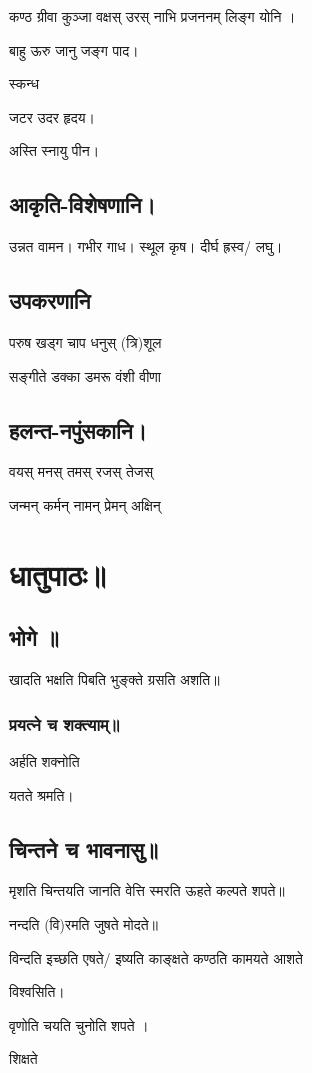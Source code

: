 \documentclass[oneside, article]{memoir}
\begin{document}
कण्ठ ग्रीवा कुञ्जा वक्षस् उरस् नाभि प्रजननम् लिङ्ग योनि ।

बाहु ऊरु जानु जङ्ग पाद।

स्कन्ध 

जटर उदर हृदय।

अस्ति स्नायु पीन।

\section{आकृति-विशेषणानि।}
उन्नत वामन। गभीर गाध। स्थूल कृष। दीर्घ ह्रस्व/ लघु।

\section{उपकरणानि}
परुष खड्ग चाप धनुस् (त्रि)शूल

सङ्गीते डक्का डमरू वंशी वीणा 

\section{हलन्त-नपुंसकानि।}
वयस् मनस् तमस् रजस् तेजस्

जन्मन् कर्मन् नामन् प्रेमन् अक्षिन्


\chapter{धातुपाठः॥}
\section{भोगे ॥}
खादति भक्षति पिबति भुङ्क्ते ग्रसति अशति॥

\subsection{प्रयत्ने च शक्त्याम्॥}
अर्हति शक्नोति

यतते श्रमति।

\section{चिन्तने च भावनासु॥}
मृशति चिन्तयति जानति वेत्ति स्मरति ऊहते कल्पते शपते॥

नन्दति (वि)रमति जुषते मोदते॥

विन्दति इच्छति एषते/ इष्यति काङ्क्षते कण्ठति कामयते आशते

विश्वसिति।

वृणोति चयति चुनोति शपते ।

शिक्षते
\end{document}
